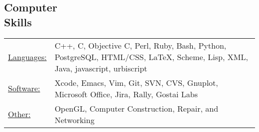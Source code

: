 \documentclass[margin]{res}
\begin{document}
\begin{resume}
\vspace*{-1mm}
\section{Computer \\ Skills}
   \begin{tabular}{l p{3in}}
    \underline{Languages:} & C++, C, Objective C, Perl, Ruby, Bash, Python, PostgreSQL, HTML/CSS, \LaTeX, Scheme, Lisp, XML, Java, javascript, urbiscript \\
     \underline{Software:} &  Xcode, Emacs, Vim, Git, SVN, CVS, Gnuplot, Microsoft Office, Jira, Rally, Gostai Labs  \\
     \underline{Other:} & OpenGL, Computer Construction, Repair, and Networking
 \end{tabular}

\end{resume} 
\end{document}
